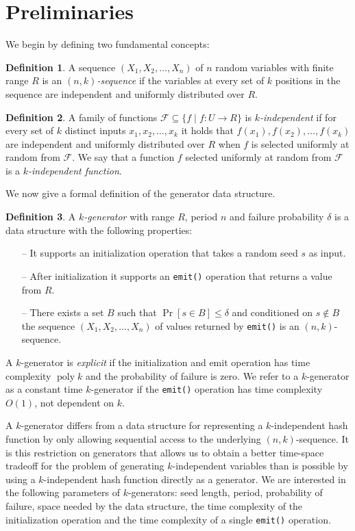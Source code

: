 \documentclass[a4paper,11pt]{article}
\theoremstyle{plain}
\theoremstyle{definition}
\newtheorem{definition}{Definition}
\DeclareMathOperator{\poly}{poly}
\begin{document}
\section{Preliminaries} \label{sec:preliminaries}
We begin by defining two fundamental concepts:
\begin{definition}
A sequence $(X_{1}, X_{2}, \dots, X_{n})$ of $n$ random variables with finite range $R$ is an \emph{$(n,k)$-sequence} if the variables at every set of $k$ positions in the sequence are independent and uniformly distributed over $R$. 
\end{definition}
\begin{definition}
A family of functions ${\mathcal{F} \subseteq \{f \mid f \colon U \to R \}}$ is \emph{$k$-independent} if for every set of $k$ distinct inputs $x_{1}, x_{2}, \dots, x_{k}$ 
it holds that $f(x_{1}), f(x_{2}), \dots, f(x_{k})$ are independent and uniformly distributed over $R$ when $f$ is selected uniformly at random from $\mathcal{F}$. 
We say that a function $f$ selected uniformly at random from $\mathcal{F}$ is a \emph{$k$-independent function}.
\end{definition}
We now give a formal definition of the generator data structure. 
\begin{definition}
A \emph{$k$-generator} with range $R$, period $n$ and failure probability $\delta$ is a data structure with the following properties:
\begin{itemize}
\item[--] It supports an initialization operation that takes a random seed $s$ as input.
\item[--] After initialization it supports an \texttt{emit()} operation that returns a value from $R$. 
\item[--] There exists a set $B$ such that $\Pr[s \in B] \leq \delta$ and conditioned on $s \not\in B$ the sequence $(X_{1}, X_{2}, \dots, X_{n})$ of values returned by \texttt{emit()} is an $(n,k)$-sequence. 
\end{itemize}
A $k$-generator is \emph{explicit} if the initialization and emit operation has time complexity $\poly k$ and the probability of failure is zero. 
We refer to a $k$-generator as a constant time $k$-generator if the \texttt{emit()} operation has time complexity $O(1)$, not dependent on $k$.
\end{definition}

A $k$-generator differs from a data structure for representing a $k$-independent hash function by only allowing sequential access to the underlying $(n,k)$-sequence. 
It is this restriction on generators that allows us to obtain a better time-space tradeoff for the problem of generating $k$-independent variables than is possible by using a $k$-independent hash function directly as a generator.  
We are interested in the following parameters of $k$-generators: seed length, period, probability of failure, space needed by the data structure, the time complexity of the initialization operation and the time complexity of a single \texttt{emit()} operation.
\end{document}

